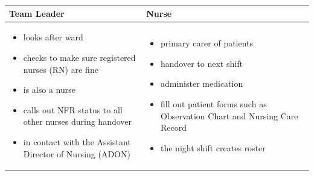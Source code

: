 \hfil\begin{tabular}{|p{7cm}|p{7cm}|}
\hline
{\hfil\bf Team Leader} & {\hfil\bf Nurse} \\
\hline
\vspace{-5mm}\begin{itemize}
\item looks after ward
\item checks to make sure registered nurses (RN) are fine
\item is also a nurse
\item calls out \gls{NFR} status to all other nurses during handover
\item in contact with the Assistant Director of Nursing (ADON)
\end{itemize} & 
\vspace{-5mm}\begin{itemize}
\item primary carer of patients
\item handover to next shift
\item administer medication
\item fill out patient forms such as Observation Chart and Nursing Care Record
\item the night shift creates roster
\end{itemize} \\ 
\hline
\end{tabular}

